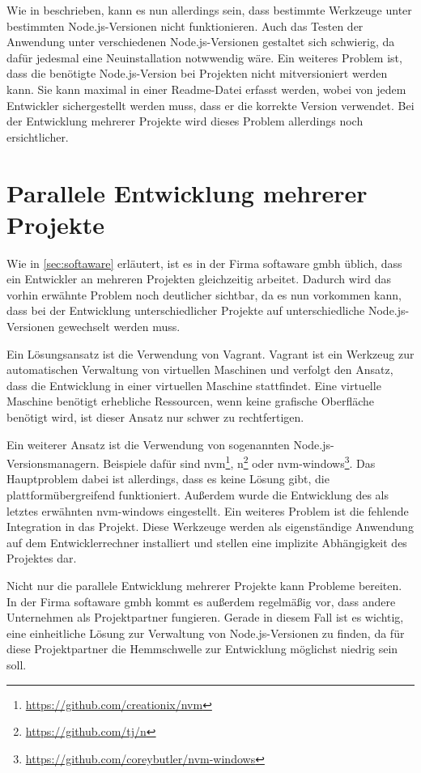 Wie in \autocite{Papa.n:online} beschrieben, kann es nun allerdings sein, dass bestimmte Werkzeuge unter bestimmten Node.js-Versionen nicht funktionieren.
Auch das Testen der Anwendung unter verschiedenen Node.js-Versionen gestaltet sich schwierig, da dafür jedesmal eine Neuinstallation notwwendig wäre.
Ein weiteres Problem ist, dass die benötigte Node.js-Version bei Projekten nicht mitversioniert werden kann.
Sie kann maximal in einer Readme-Datei erfasst werden, wobei von jedem Entwickler sichergestellt werden muss, dass er die korrekte Version verwendet.
Bei der Entwicklung mehrerer Projekte wird dieses Problem allerdings noch ersichtlicher.


\section{Parallele Entwicklung mehrerer Projekte}
Wie in \cref{sec:softaware} erläutert, ist es in der Firma softaware gmbh üblich, dass ein Entwickler an mehreren Projekten gleichzeitig arbeitet.
Dadurch wird das vorhin erwähnte Problem noch deutlicher sichtbar, da es nun vorkommen kann, dass bei der Entwicklung unterschiedlicher Projekte auf unterschiedliche Node.js-Versionen gewechselt werden muss.

Ein Lösungsansatz ist die Verwendung von Vagrant. 
Vagrant ist ein Werkzeug zur automatischen Verwaltung von virtuellen Maschinen und verfolgt den Ansatz, dass die Entwicklung in einer virtuellen Maschine stattfindet.
Eine virtuelle Maschine benötigt erhebliche Ressourcen, wenn keine grafische Oberfläche benötigt wird, ist dieser Ansatz nur schwer zu rechtfertigen.

Ein weiterer Ansatz ist die Verwendung von sogenannten Node.js-Versionsmanagern.
Beispiele dafür sind nvm\footnote{\url{https://github.com/creationix/nvm}}, n\footnote{\url{https://github.com/tj/n}} oder nvm-windows\footnote{\url{https://github.com/coreybutler/nvm-windows}}.
Das Hauptproblem dabei ist allerdings, dass es keine Lösung gibt, die plattformübergreifend funktioniert.
Außerdem wurde die Entwicklung des als letztes erwähnten nvm-windows eingestellt.
Ein weiteres Problem ist die fehlende Integration in das Projekt.
Diese Werkzeuge werden als eigenständige Anwendung auf dem Entwicklerrechner installiert und stellen eine implizite Abhängigkeit des Projektes dar.

Nicht nur die parallele Entwicklung mehrerer Projekte kann Probleme bereiten.
In der Firma softaware gmbh kommt es außerdem regelmäßig vor, dass andere Unternehmen als Projektpartner fungieren.
Gerade in diesem Fall ist es wichtig, eine einheitliche Lösung zur Verwaltung von Node.js-Versionen zu finden, da für diese Projektpartner die Hemmschwelle zur Entwicklung möglichst niedrig sein soll.


